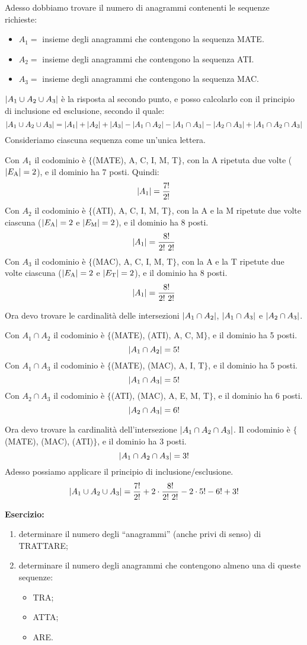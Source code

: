 Adesso dobbiamo trovare il numero di anagrammi contenenti le sequenze richieste:
\begin{itemize}
  \item $A_1 = $ insieme degli anagrammi che contengono la sequenza MATE.
  \item $A_2 = $ insieme degli anagrammi che contengono la sequenza ATI.
  \item $A_3 = $ insieme degli anagrammi che contengono la sequenza MAC.
\end{itemize}
$\left\lvert{A_1 \cup A_2 \cup A_3}\right\rvert$ \`e la risposta al secondo punto, e posso calcolarlo con il principio di inclusione ed esclusione, secondo il quale:
\[
\left\lvert{A_1 \cup A_2 \cup A_3}\right\rvert = \left\lvert{A_1}\right\rvert + \left\lvert{A_2}\right\rvert + \left\lvert{A_3}\right\rvert - \left\lvert{A_1 \cap A_2}\right\rvert - \left\lvert{A_1 \cap A_3}\right\rvert - \left\lvert{A_2 \cap A_3}\right\rvert + \left\lvert{A_1 \cap A_2 \cap A_3}\right\rvert
\]
Consideriamo ciascuna sequenza come un'unica lettera. 

Con $A_1$ il codominio \`e $\{ $(MATE), A, C, I, M, T$\}$, con la A ripetuta due volte ($\left\lvert{E_{\text{A}}}\right\rvert = 2$), e il dominio ha 7 posti. Quindi:
\[
\left\lvert{A_1}\right\rvert = \frac{7!}{2!}
\]
Con $A_2$ il codominio \`e $\{ $(ATI), A, C, I, M, T$\}$, con la A e la M ripetute due volte ciascuna ($\left\lvert{E_{\text{A}}}\right\rvert = 2$ e $\left\lvert{E_{\text{M}}}\right\rvert = 2$), e il dominio ha 8 posti.
\[
\abs{A_1} = \frac{8!}{2! \ 2!}
\]
Con $A_3$ il codominio \`e $\{ $(MAC), A, C, I, M, T$\}$, con la A e la T ripetute due volte ciascuna ($\left\lvert{E_{\text{A}}}\right\rvert = 2$ e $\left\lvert{E_{\text{T}}}\right\rvert = 2$), e il dominio ha 8 posti.
\[
\abs{A_1} = \frac{8!}{2! \ 2!}
\]

Ora devo trovare le cardinalit\`a delle intersezioni $\left\lvert{A_1 \cap A_2}\right\rvert$, $\left\lvert{A_1 \cap A_3}\right\rvert$ e $\left\lvert{A_2 \cap A_3}\right\rvert$.

Con $A_1 \cap A_2$ il codominio \`e $\{ $(MATE), (ATI), A, C, M$\}$, e il dominio ha 5 posti.
\[
\left\lvert{A_1 \cap A_2}\right\rvert = 5!
\]
Con $A_1 \cap A_3$ il codominio \`e $\{ $(MATE), (MAC), A, I, T$\}$, e il dominio ha 5 posti.
\[
\left\lvert{A_1 \cap A_3}\right\rvert = 5!
\]
Con $A_2 \cap A_3$ il codominio \`e $\{ $(ATI), (MAC), A, E, M, T$\}$, e il dominio ha 6 posti.
\[
\left\lvert{A_2 \cap A_3}\right\rvert = 6!
\]

Ora devo trovare la cardinalit\`a dell'intersezione $\left\lvert{A_1 \cap A_2 \cap A_3}\right\rvert$. Il codominio \`e $\{ $(MATE), (MAC), (ATI)$\}$, e il dominio ha 3 posti.
\[
\left\lvert{A_1 \cap A_2 \cap A_3}\right\rvert = 3!
\]
Adesso possiamo applicare il principio di inclusione/esclusione.
\[
\left\lvert{A_1 \cup A_2 \cup A_3}\right\rvert = 
\frac{7!}{2!} + 2 \cdot \frac{8!}{2! \ 2!} - 2 \cdot 5! - 6! + 3!
\]

\textbf{Esercizio:} 
\begin{enumerate}
  \item determinare il numero degli ``anagrammi'' (anche privi di senso) di TRATTARE;
  \item determinare il numero degli anagrammi che contengono almeno una di queste sequenze:
  \begin{itemize}
    \item TRA;
    \item ATTA;
    \item ARE.
  \end{itemize}
\end{enumerate}

